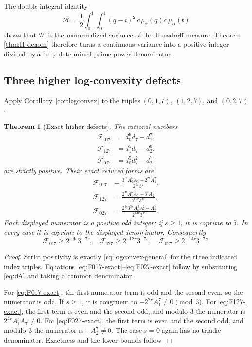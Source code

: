 \documentclass[11pt,oneside]{article}
\newtheorem{theorem}{Theorem}[section]
\theoremstyle{definition}
\theoremstyle{remark}
\newcommand{\dd}{\,\mathrm d}
\begin{document}
The double-integral identity
\begin{equation}\label{eq:H-variance}
 \mathcal H
 =\frac12\int_0^1\int_0^1(q-t)^2\dd\mu_\alpha(q)\dd\mu_\alpha(t)
\end{equation}
shows that $\mathcal H$ is the unnormalized variance of the Hausdorff measure.  Theorem
\ref{thm:H-denom} therefore turns a continuous variance into a positive integer divided by a
fully determined prime-power denominator.

\subsection{Three higher log-convexity defects}

Apply Corollary~\ref{cor:logconvex} to the triples $(0,1,7)$, $(1,2,7)$, and $(0,2,7)$.

\begin{theorem}[Exact higher defects]\label{thm:higher-defects}
The rational numbers
\begin{align}
 \mathcal F_{017}&=d_0^6d_7-d_1^7,\label{eq:F017}\\
 \mathcal F_{127}&=d_1^5d_7-d_2^6,\label{eq:F127}\\
 \mathcal F_{027}&=d_0^5d_7^2-d_2^7\label{eq:F027}
\end{align}
are strictly positive.  Their exact reduced forms are
\begin{align}
 \mathcal F_{017}
 &=\frac{3^{5s}A_0^6A_7-2^{2r}A_1^7}
 {2^{9r}3^{7s}},\label{eq:F017-exact}\\
 \mathcal F_{127}
 &=\frac{2^{4r}A_1^5A_7-3^sA_2^6}
 {2^{12r}3^{7s}},\label{eq:F127-exact}\\
 \mathcal F_{027}
 &=\frac{2^{3r}3^{3s}A_0^5A_7^2-A_2^7}
 {2^{14r}3^{7s}}.\label{eq:F027-exact}
\end{align}
Each displayed numerator is a positive odd integer; if $s\ge1$, it is coprime to $6$.  In every case it is coprime to the displayed denominator.  Consequently
\begin{equation}\label{eq:F-lowers}
 \mathcal F_{017}\ge2^{-9r}3^{-7s},\quad
 \mathcal F_{127}\ge2^{-12r}3^{-7s},\quad
 \mathcal F_{027}\ge2^{-14r}3^{-7s}.
\end{equation}
\end{theorem}

\begin{proof}
Strict positivity is exactly \eqref{eq:logconvex-general} for the three indicated index
triples.  Equations \eqref{eq:F017-exact}--\eqref{eq:F027-exact} follow by substituting
\eqref{eq:dA} and taking a common denominator.

For \eqref{eq:F017-exact}, the first numerator term is odd and the second even, so the
numerator is odd.  If $s\ge1$, it is congruent to $-2^{2r}A_1^7\ne0\pmod3$.
For \eqref{eq:F127-exact}, the first term is even and the second odd, and modulo $3$ the
numerator is $2^{4r}A_1^5A_7\ne0$.  For \eqref{eq:F027-exact}, the first term is even and the
second odd, and modulo $3$ the numerator is $-A_2^7\ne0$.  The case $s=0$ again has no
triadic denominator.  Exactness and the lower bounds follow.
\end{proof}
\end{document}
